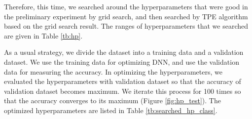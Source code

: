 \documentclass[useamsfonts]{pasj01}
\begin{document}
Therefore, this time, we searched around the hyperparameters that were good in the preliminary experiment by grid search, and then searched by TPE algorithm based 
on the grid search result.
The ranges of hyperparameters that we searched are given in Table \ref{tb:hp}.

As a usual strategy, we divide the dataset into a training data and a validation dataset.
We use the training data for optimizing DNN, and use the validation data for measuring the accuracy.
In optimizing the hyperparameters, we evaluated the hyperparameters with validation dataset so
that the accuracy of validation dataset becomes maximum.
We iterate this process for 100 times so that the accuracy converges to its maximum (Figure \ref{fig:hp_test}).
The optimized hyperparameters are listed in Table \ref{tb:searched_hp_class}.

%
\begin{table}[htbp]
  \label{tb:hp}
\end{table}
\end{document}
